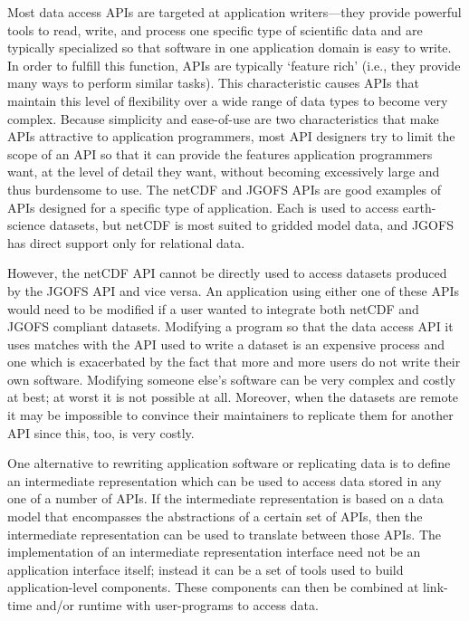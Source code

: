 Most data access APIs are targeted at application writers---they provide
powerful tools to read, write, and process one specific type of scientific
data and are typically specialized so that software in one application domain
is easy to write. In order to fulfill this function, APIs are typically
`feature rich' (i.e., they provide many ways to perform similar tasks). This
characteristic causes APIs that maintain this level of flexibility over a
wide range of data types to become very complex. Because simplicity and
ease-of-use are two characteristics that make APIs attractive to application
programmers, most API designers try to limit the scope of an API so that it
can provide the features application programmers want, at the level of detail
they want, without becoming excessively large and thus burdensome to use.
The netCDF and JGOFS APIs are good examples of APIs designed for a specific
type of application.  Each is used to access earth-science datasets, but
netCDF is most suited to gridded model data, and JGOFS has direct support
only for relational data.

However, the netCDF API cannot be directly used to access datasets produced
by the JGOFS API and vice versa. An application using either one of these
APIs would need to be modified if a user wanted to integrate both netCDF and
JGOFS compliant datasets. Modifying a program so that the data access API it
uses matches with the API used to write a dataset is an expensive process
and one which is exacerbated by the fact that more and more users do not
write their own software. Modifying someone else's software can be very
complex and costly at best; at worst it is not possible at all.  Moreover,
when the datasets are remote it may be impossible to convince their
maintainers to replicate them for another API since this, too, is very
costly.

One alternative to rewriting application software or replicating data is to
define an intermediate representation which can be used to access data stored
in any one of a number of APIs.  If the intermediate representation is based
on a data model that encompasses the abstractions of a certain set of APIs,
then the intermediate representation can be used to translate between those
APIs. The implementation of an intermediate representation interface need not
be an application interface itself; instead it can be a set of tools used to
build application-level components. These components can then be combined at
link-time and/or runtime with user-programs to access data.


